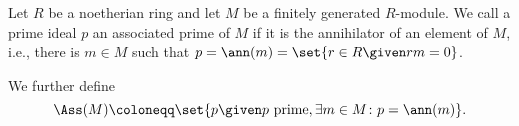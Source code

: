 Let $R$ be a noetherian ring and let $M$ be a finitely generated $R$-module.
We call a prime ideal  $p$ an associated prime of $M$ if it is the annihilator
of an element of $M$, i.e., there is $m \in M$ such that $p = \ann(m) = \set{r \in R\given rm = 0}$.

We further define
\[ \Ass(M) \coloneqq\set{p\given p\text{ prime}, \exists m \in M\colon p = \ann(m)}. \]
